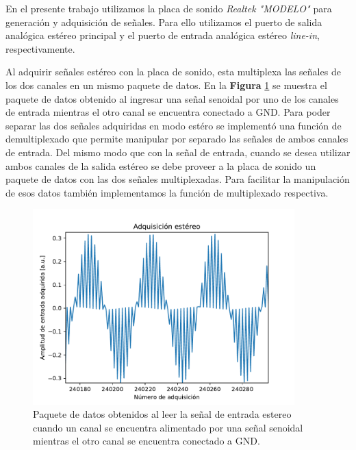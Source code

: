 \documentclass[a4paper,11pt]{article}
\begin{document}
En el presente trabajo utilizamos la placa de sonido \emph{Realtek
"MODELO"} para generación y adquisición de señales.  Para ello
utilizamos el puerto de salida analógica estéreo principal y el puerto
de entrada analógica estéreo \emph{line-in}, respectivamente.

Al adquirir señales estéreo con la placa de sonido, esta multiplexa las
señales de los dos canales en un mismo paquete de datos. En la
\textbf{Figura} \ref{fig:multiplexado} se muestra el paquete de datos
obtenido al ingresar una señal senoidal por uno de los canales de
entrada mientras el otro canal se encuentra conectado a
GND.
Para poder separar las dos señales adquiridas en modo estéro se
implementó una función de demultiplexado que permite manipular por
separado las señales de ambos canales de entrada.  Del mismo modo que
con la señal de entrada, cuando se desea utilizar ambos canales de la
salida estéreo se debe proveer a la placa de sonido un paquete de datos
con las dos señales multiplexadas. Para facilitar la manipulación de esos
datos también implementamos la función de multiplexado respectiva.

    \begin{figure}[!h] 
        \centering
        \includegraphics[width=0.9\textwidth]{imagenes/estereo.pdf}
        \caption{Paquete de datos obtenidos al leer la señal de entrada
estereo cuando un canal se encuentra alimentado por una señal senoidal
mientras el otro canal se encuentra conectado a GND.}
        \label{fig:multiplexado} 
    \end{figure}
\end{document}
